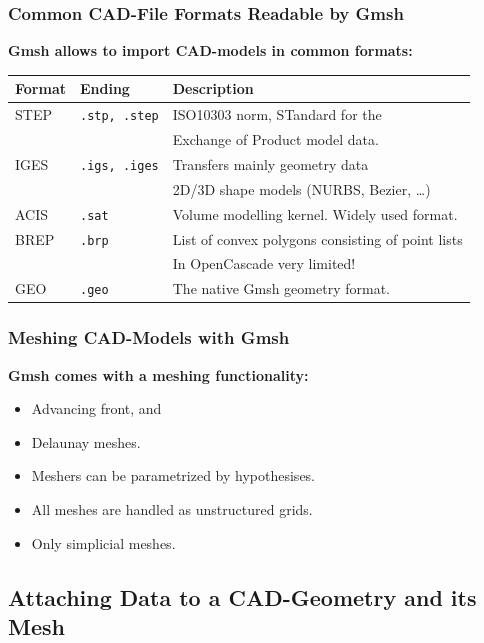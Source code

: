 \begin{frame}
  \frametitle{Common CAD-File Formats Readable by Gmsh}
  \textbf{Gmsh allows to import CAD-models in common formats:}
  \begin{center}
    \begin{tabular}{|l|l|l|}
      \hline
      Format & Ending & Description
      \\
      \hline
      \hline
      STEP & \lstinline!.stp, .step! & ISO10303 norm, STandard for the\\
      & & Exchange of Product model data.
      \\
      \hline
      IGES & \lstinline!.igs, .iges! & Transfers mainly geometry data\\
      & & 2D/3D shape models (NURBS, Bezier, \ldots)
      \\
      \hline
      ACIS & \lstinline!.sat! & Volume modelling kernel. Widely used format.
      \\
      \hline
      BREP & \lstinline!.brp! & List of convex polygons consisting of point lists\\
      & & In OpenCascade very limited!
      \\
      \hline
      GEO & \lstinline!.geo! & The native Gmsh geometry format.
      \\
      \hline
    \end{tabular}
  \end{center}
\end{frame}

\begin{frame}
  \frametitle{Meshing CAD-Models with Gmsh}
  \textbf{Gmsh comes with a meshing functionality:}
  \begin{itemize}
    \item Advancing front, and
    \item Delaunay meshes.
    \item Meshers can be parametrized by hypothesises.
    \item All meshes are handled as unstructured grids.
    \item Only simplicial meshes.
  \end{itemize}
\end{frame}

\subsection{Attaching Data to a CAD-Geometry and its Mesh}

